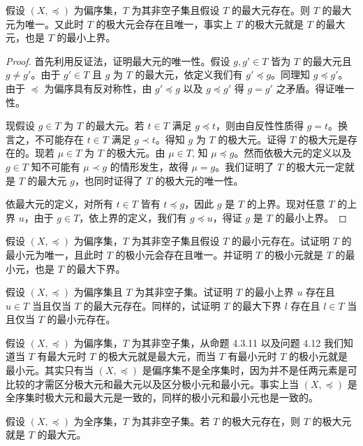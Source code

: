 \begin{proposition}
假设 $(X, \preceq)$ 为偏序集，$T$ 为其非空子集且假设 $T$ 的最大元存在。则 $T$ 的最大元为唯一。又此时 $T$ 的极大元会存在且唯一，事实上 $T$ 的极大元就是 $T$ 的最大元，也是 $T$ 的最小上界。
\end{proposition}

\begin{proof}
首先利用反证法，证明最大元的唯一性。假设 $g, g' \in T$ 皆为 $T$ 的最大元且 $g \neq g'$。由于 $g' \in T$ 且 $g$ 为 $T$ 的最大元，依定义我们有 $g' \preceq g$。同理知 $g \preceq g'$。由于 $\preceq$ 为偏序具有反对称性，由 $g' \preceq g$ 以及 $g \preceq g'$ 得 $g = g'$ 之矛盾。得证唯一性。

现假设 $g \in T$ 为 $T$ 的最大元。若 $t \in T$ 满足 $g \preceq t$，则由自反性性质得 $g = t$。换言之，不可能存在 $t \in T$ 满足 $g \prec t$。得知 $g$ 为 $T$ 的极大元。证得 $T$ 的极大元是存在的。现若 $\mu \in T$ 为 $T$ 的极大元。由 $\mu \in T$, 知 $\mu \preceq g$。然而依极大元的定义以及 $g \in T$ 知不可能有 $\mu \prec g$ 的情形发生，故得 $\mu = g$。我们证明了 $T$ 的极大元一定就是 $T$ 的最大元 $g$，也同时证得了 $T$ 的极大元的唯一性。

依最大元的定义，对所有 $t \in T$ 皆有 $t \preceq g$，因此 $g$ 是 $T$ 的上界。现对任意 $T$ 的上界 $u$，由于 $g \in T$，依上界的定义，我们有 $g \preceq u$，得证 $g$ 是 $T$ 的最小上界。
\end{proof}

\begin{question}
假设 $(X, \preceq)$ 为偏序集，$T$ 为其非空子集且假设 $T$ 的最小元存在。试证明 $T$ 的最小元为唯一，且此时 $T$ 的极小元会存在且唯一。并证明 $T$ 的极小元就是 $T$ 的最小元，也是 $T$ 的最大下界。
\end{question}

\begin{question}
假设 $(X, \preceq)$ 为偏序集且 $T$ 为其非空子集。试证明 $T$ 的最小上界 $u$ 存在且 $u \in T$ 当且仅当 $T$ 的最大元存在。同样的，试证明 $T$ 的最大下界 $l$ 存在且 $l \in T$ 当且仅当 $T$ 的最小元存在。
\end{question}

假设 $(X, \preceq)$ 为偏序集，$T$ 为其非空子集，从命题 4.3.11 以及问题 4.12 我们知道当 $T$ 有最大元时 $T$ 的极大元就是最大元，而当 $T$ 有最小元时 $T$ 的极小元就是最小元。其实只有当 $(X, \preceq)$ 是偏序集不是全序集时，因为并不是任两元素是可比较的才需区分极大元和最大元以及区分极小元和最小元。事实上当 $(X, \preceq)$ 是全序集时极大元和最大元是一致的，同样的极小元和最小元也是一致的。

\begin{proposition}
假设 $(X, \preceq)$ 为全序集，$T$ 为其非空子集。若 $T$ 的极大元存在，则 $T$ 的极大元就是 $T$ 的最大元。
\end{proposition}

